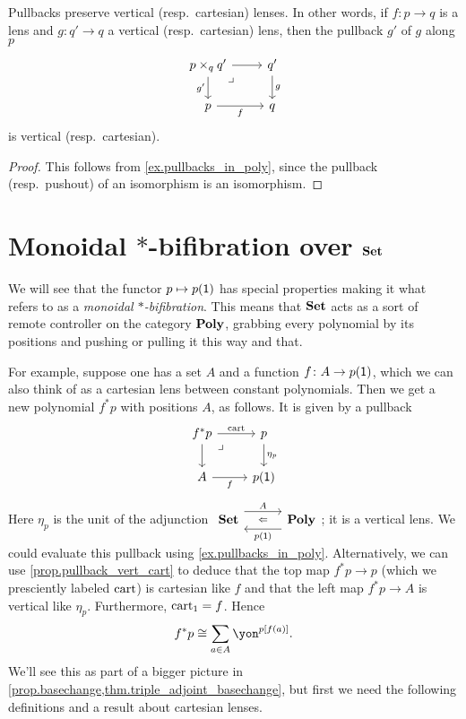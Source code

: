 \documentclass[Book-Poly]{subfiles}
\begin{document}
\begin{proposition}\label{prop.pullback_vert_cart}
Pullbacks preserve vertical (resp.\ cartesian) lenses.
In other words, if $f\colon p\to q$ is a lens and $g\colon q'\to q$ a vertical (resp.\ cartesian) lens, then the pullback $g'$ of $g$ along $p$
\[
\begin{tikzcd}
	p\times_qq'\ar[r]\ar[d, "g'"']&
	q'\ar[d, "g"]\\
	p\ar[r, "f"']&
	q\ar[ul, phantom, very near end, "\lrcorner"]
\end{tikzcd}
\]
is vertical (resp.\ cartesian).
\end{proposition}
\begin{proof}
This follows from \cref{ex.pullbacks_in_poly}, since the pullback (resp.\ pushout) of an isomorphism is an isomorphism.
\end{proof}

\section{Monoidal $*$-bifibration over $\mathbf{Set}$}

We will see that the functor $p\mapsto p(\textsf{1})$ has special properties making it what
\cite{shulman2008framed} refers to as a \emph{monoidal $*$-bifibration}. This means that $\mathbf{Set}$ acts as a sort of remote controller on the category $\mathbf{Poly}$, grabbing every polynomial by its positions and pushing or pulling it this way and that. 

For example, suppose one has a set $A$ and a function $f\colon A\to p(\textsf{1})$, which we can also think of as a cartesian lens between constant polynomials.
Then we get a new polynomial $f^*p$ with positions $A$, as follows.
It is given by a pullback
\begin{equation}\label{eqn.f^*_defined}
\begin{tikzcd}
	f^*p\ar[r, "\fun{cart}"]\ar[d]&
	p\ar[d, "\eta_p"]\\
	A\ar[r, "f"']&
	p(\1)\ar[ul, phantom, very near end, "\lrcorner"]
\end{tikzcd}
\end{equation}
Here $\eta_p$ is the unit of the adjunction $\adjr{\smset}{A}{p(\1)}{\poly}$; it is a vertical lens.
We could evaluate this pullback using \cref{ex.pullbacks_in_poly}.
Alternatively, we can use \cref{prop.pullback_vert_cart} to deduce that the top map $f^*p\to p$ (which we presciently labeled $\mathrm{cart}$) is cartesian like $f$ and that the left map $f^*p\to A$ is vertical like $\eta_p$. Furthermore, $\mathrm{cart}_1 = f$.
Hence
\[
    f^*p \iso \sum_{a \in A} \yon^{p[f(a)]}.
\]
We'll see this as part of a bigger picture in \cref{prop.basechange,thm.triple_adjoint_basechange}, but first we need the following definitions and a result about cartesian lenses.
\end{document}
